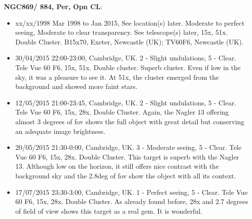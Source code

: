 {\bf NGC869/ 884, Per, Opn CL}:
\begin{itemize}
\item xx/xx/1998 Mar 1998 to Jan 2015, See location(s) later. Moderate to perfect seeing, Moderate to clear transparency. See telescope(s) later, 15x, 51x. Double Cluster. B15x70, Exeter, Newcastle (UK); TV60F6, Newcastle (UK).
\item 30/04/2015 22:00-23:00, Cambridge, UK. 2 - Slight undulations, 5 - Clear. Tele Vue 60 F6, 15x, 51x. Double cluster. Superb cluster. Even if low in the sky, it was a pleasure to see it. At 51x, the cluster emerged from the background and showed more faint stars.
\item 12/05/2015 21:00-23:45, Cambridge, UK. 2 - Slight undulations, 5 - Clear. Tele Vue 60 F6, 15x, 28x. Double Cluster. Again, the Nagler 13 offering almost 3 degrees of fov shows the full object with great detail but conserving an adequate image brightness. 
\item 20/05/2015 21:30-0:00, Cambridge, UK. 3 - Moderate seeing, 5 - Clear. Tele Vue 60 F6, 15x, 28x. Double Cluster. This target is superb with the Nagler 13. Although low on the horizon, it still offers nice contrast with the background sky and the 2.8deg of fov show the object with all its context.
\item 17/07/2015 23:30-3:00, Cambridge, UK. 1 - Perfect seeing, 5 - Clear. Tele Vue 60 F6, 15x, 28x. Double Cluster. As already found before, 28x and 2.7 degrees of field of view shows this target as a real gem. It is wonderful.
\end{itemize}
